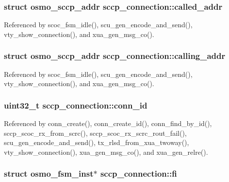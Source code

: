 \subsubsection[{called\+\_\+addr}]{\setlength{\rightskip}{0pt plus 5cm}struct {\bf osmo\+\_\+sccp\+\_\+addr} sccp\+\_\+connection\+::called\+\_\+addr}\label{structsccp__connection_aa1181557a1fe1326215cd39636c749fd}


Referenced by scoc\+\_\+fsm\+\_\+idle(), scu\+\_\+gen\+\_\+encode\+\_\+and\+\_\+send(), vty\+\_\+show\+\_\+connection(), and xua\+\_\+gen\+\_\+msg\+\_\+co().

\subsubsection[{calling\+\_\+addr}]{\setlength{\rightskip}{0pt plus 5cm}struct {\bf osmo\+\_\+sccp\+\_\+addr} sccp\+\_\+connection\+::calling\+\_\+addr}\label{structsccp__connection_a0969a790ec8b2703cd829dc55c98bc7e}


Referenced by scoc\+\_\+fsm\+\_\+idle(), scu\+\_\+gen\+\_\+encode\+\_\+and\+\_\+send(), vty\+\_\+show\+\_\+connection(), and xua\+\_\+gen\+\_\+msg\+\_\+co().

\subsubsection[{conn\+\_\+id}]{\setlength{\rightskip}{0pt plus 5cm}uint32\+\_\+t sccp\+\_\+connection\+::conn\+\_\+id}\label{structsccp__connection_a10c6196b8e56c80eb4032dd5dd440304}


Referenced by conn\+\_\+create(), conn\+\_\+create\+\_\+id(), conn\+\_\+find\+\_\+by\+\_\+id(), sccp\+\_\+scoc\+\_\+rx\+\_\+from\+\_\+scrc(), sccp\+\_\+scoc\+\_\+rx\+\_\+scrc\+\_\+rout\+\_\+fail(), scu\+\_\+gen\+\_\+encode\+\_\+and\+\_\+send(), tx\+\_\+rlsd\+\_\+from\+\_\+xua\+\_\+twoway(), vty\+\_\+show\+\_\+connection(), xua\+\_\+gen\+\_\+msg\+\_\+co(), and xua\+\_\+gen\+\_\+relre().

\subsubsection[{fi}]{\setlength{\rightskip}{0pt plus 5cm}struct osmo\+\_\+fsm\+\_\+inst$\ast$ sccp\+\_\+connection\+::fi}\label{structsccp__connection_ad025b54594946a73287551ebeb462d9e}


